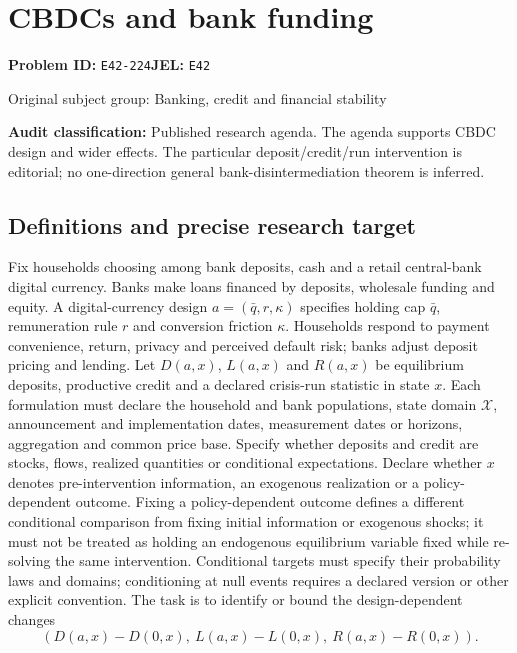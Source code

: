 \documentclass[11pt,a4paper]{article}
\begin{document}
\section*{CBDCs and bank funding}
\textbf{Problem ID:} \texttt{E42-224}\quad \textbf{JEL:} \texttt{E42}\par
\label{problem:OP-0329}
{\sffamily\small\color{muted}Original subject group: Banking, credit and financial stability\par}
\label{definitions:problem:30007611}
\textbf{Audit classification:} Published research agenda. The agenda supports CBDC design and wider effects. The particular deposit/credit/run intervention is editorial; no one-direction general bank-disintermediation theorem is inferred.
\subsection*{Definitions and precise research target}
Fix households choosing among bank deposits, cash and a retail central-bank digital currency. Banks make loans financed by deposits, wholesale funding and equity. A digital-currency design \(a=(\bar q,r,\kappa)\) specifies holding cap \(\bar q\), remuneration rule \(r\) and conversion friction \(\kappa\). Households respond to payment convenience, return, privacy and perceived default risk; banks adjust deposit pricing and lending. Let \(D(a,x)\), \(L(a,x)\) and \(R(a,x)\) be equilibrium deposits, productive credit and a declared crisis-run statistic in state \(x\). Each formulation must declare the household and bank populations, state domain \(\mathcal X\), announcement and implementation dates, measurement dates or horizons, aggregation and common price base. Specify whether deposits and credit are stocks, flows, realized quantities or conditional expectations. Declare whether \(x\) denotes pre-intervention information, an exogenous realization or a policy-dependent outcome. Fixing a policy-dependent outcome defines a different conditional comparison from fixing initial information or exogenous shocks; it must not be treated as holding an endogenous equilibrium variable fixed while re-solving the same intervention. Conditional targets must specify their probability laws and domains; conditioning at null events requires a declared version or other explicit convention. The task is to identify or bound the design-dependent changes
\[(D(a,x)-D(0,x),\ L(a,x)-L(0,x),\ R(a,x)-R(0,x)).\]
\end{document}
